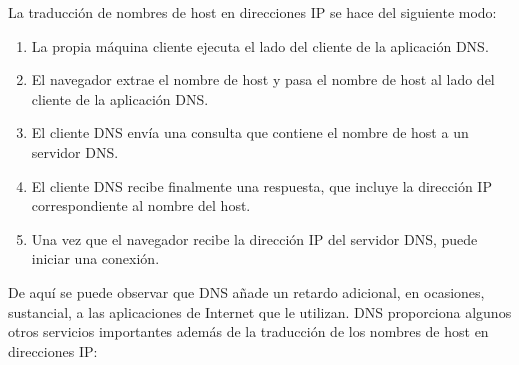 \documentclass[a4paper,11pt]{article}
\begin{document}
La traducción de nombres de host en direcciones IP se hace del siguiente modo:

\begin{enumerate}
\item La propia máquina cliente ejecuta el lado del cliente de la aplicación DNS.
\item El navegador extrae el nombre de host y pasa el nombre de host al lado del cliente de la aplicación DNS.
\item El cliente DNS envía una consulta que contiene el nombre de host a un servidor DNS.
\item El cliente DNS recibe finalmente una respuesta, que incluye la dirección IP correspondiente al nombre del host.
\item Una vez que el navegador recibe la dirección IP del servidor DNS, puede iniciar una conexión.
\end{enumerate}

De aquí se puede observar que DNS añade un retardo adicional, en ocasiones, sustancial, a las aplicaciones de Internet que le utilizan. DNS proporciona algunos otros servicios importantes además de la traducción de los nombres de host en direcciones IP: 
\end{document}
